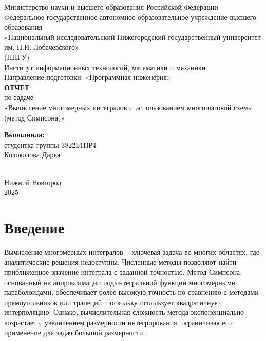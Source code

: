 \documentclass[12pt]{article}
\begin{document}
\begin{titlepage}
    \centering
    \large
    Министерство науки и высшего образования Российской Федерации\\[0.5cm]
    Федеральное государственное автономное образовательное учреждение высшего образования\\[0.5cm]
    «Национальный исследовательский Нижегородский государственный университет им. Н.И. Лобачевского» \\
    (ННГУ)\\[1cm]
    Институт информационных технологий, математики и механики\\[0.5cm]
    Направление подготовки: «Программная инженерия»\\[1cm]

    \vspace{1cm}
    {\LARGE \textbf{ОТЧЕТ}}\\[0.5cm]
    {\Large по задаче}\\[0.5cm]
    {\LARGE {«Вычисление многомерных интегралов с использованием многошаговой схемы (метод Симпсона)»}}\\[0.5cm]
    \vspace{2cm}
    \hfill\parbox{0.4\textwidth}{
        \textbf{Выполнила:} \\
        студентка группы 3822Б1ПР4 \\
        {Колоколова Дарья}
    }\\[0.5cm]
    \vfill
    Нижний Новгород\\
    2025
\end{titlepage}


\thispagestyle{empty}
\clearpage
{} 
\setcounter{page}{2} 
\tableofcontents
\clearpage
\setcounter{page}{3} 
\section{Введение}

\hspace*{1.35em}Вычисление многомерных интегралов – ключевая задача во многих областях, где аналитические решения недоступны. Численные методы позволяют найти приближенное значение интеграла с заданной точностью. Метод Симпсона, основанный на аппроксимации подынтегральной функции многомерными параболоидами, обеспечивает более высокую точность по сравнению с методами прямоугольников или трапеций, поскольку использует квадратичную интерполяцию. Однако, вычислительная сложность метода экспоненциально возрастает с увеличением размерности интегрирования, ограничивая его применение для задач большой размерности.
\end{document}
